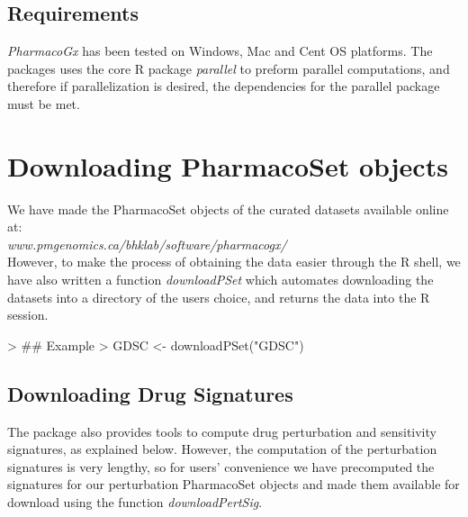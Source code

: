 \documentclass[11pt]{article}
\begin{document}
\subsection*{Requirements}

\textit{PharmacoGx} has been tested on Windows, Mac and Cent OS platforms. The packages uses the core R package \textit{parallel} to preform parallel computations, and therefore if parallelization is desired, the dependencies for the parallel package must be met. 

\section{Downloading PharmacoSet objects}

We have made the PharmacoSet objects of the curated datasets available online at:\\ \textit{www.pmgenomics.ca/bhklab/software/pharmacogx/}\\

However, to make the process of obtaining the data easier through the R shell, we have also written a function \textit{downloadPSet} which automates downloading the datasets into a directory of the users choice, and returns the data into the R session. 

\begin{Schunk}
\begin{Sinput}
> ## Example
> GDSC <- downloadPSet("GDSC") 
\end{Sinput}
\end{Schunk}
\subsection*{Downloading Drug Signatures}

The package also provides tools to compute drug perturbation and sensitivity signatures, as explained below. However, the computation of the perturbation signatures is very lengthy, so for users' convenience we have precomputed the signatures for our perturbation PharmacoSet objects and made them available for download using the function \textit{downloadPertSig}.
\end{document}
